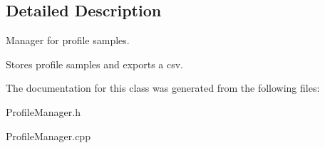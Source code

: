 \subsection{Detailed Description}
Manager for profile samples. 

Stores profile samples and exports a csv. 

The documentation for this class was generated from the following files\+:\begin{DoxyCompactItemize}
\item 
Profile\+Manager.\+h\item 
Profile\+Manager.\+cpp\end{DoxyCompactItemize}
